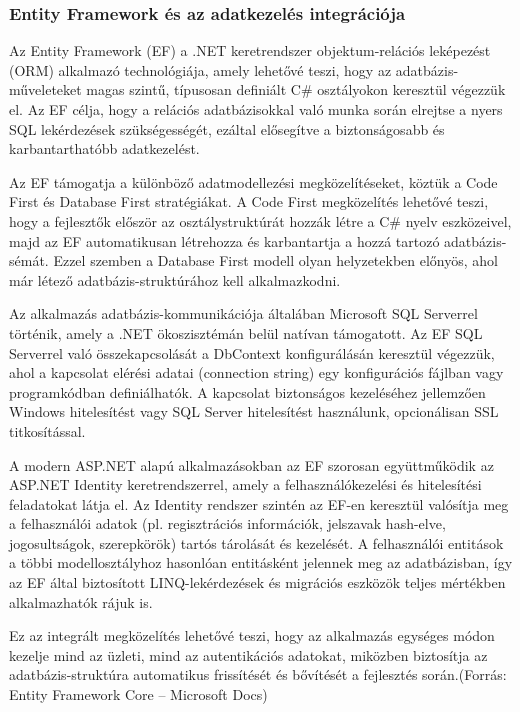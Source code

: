 \subsubsection{Entity Framework és az adatkezelés integrációja}

\indent Az Entity Framework (EF) a .NET keretrendszer objektum-relációs leképezést (ORM) alkalmazó technológiája, amely lehetővé teszi, hogy az adatbázis-műveleteket magas szintű, típusosan definiált C\# osztályokon keresztül végezzük el. Az EF célja, hogy a relációs adatbázisokkal való munka során elrejtse a nyers SQL lekérdezések szükségességét, ezáltal elősegítve a biztonságosabb és karbantarthatóbb adatkezelést.

Az EF támogatja a különböző adatmodellezési megközelítéseket, köztük a Code First és Database First stratégiákat. A Code First megközelítés lehetővé teszi, hogy a fejlesztők először az osztálystruktúrát hozzák létre a C\# nyelv eszközeivel, majd az EF automatikusan létrehozza és karbantartja a hozzá tartozó adatbázis-sémát. Ezzel szemben a Database First modell olyan helyzetekben előnyös, ahol már létező adatbázis-struktúrához kell alkalmazkodni.

Az alkalmazás adatbázis-kommunikációja általában Microsoft SQL Serverrel történik, amely a .NET ökoszisztémán belül natívan támogatott. Az EF SQL Serverrel való összekapcsolását a DbContext konfigurálásán keresztül végezzük, ahol a kapcsolat elérési adatai (connection string) egy konfigurációs fájlban vagy programkódban definiálhatók. A kapcsolat biztonságos kezeléséhez jellemzően Windows hitelesítést vagy SQL Server hitelesítést használunk, opcionálisan SSL titkosítással.

A modern ASP.NET alapú alkalmazásokban az EF szorosan együttműködik az ASP.NET Identity keretrendszerrel, amely a felhasználókezelési és hitelesítési feladatokat látja el. Az Identity rendszer szintén az EF-en keresztül valósítja meg a felhasználói adatok (pl. regisztrációs információk, jelszavak hash-elve, jogosultságok, szerepkörök) tartós tárolását és kezelését. A felhasználói entitások a többi modellosztályhoz hasonlóan entitásként jelennek meg az adatbázisban, így az EF által biztosított LINQ-lekérdezések és migrációs eszközök teljes mértékben alkalmazhatók rájuk is.

Ez az integrált megközelítés lehetővé teszi, hogy az alkalmazás egységes módon kezelje mind az üzleti, mind az autentikációs adatokat, miközben biztosítja az adatbázis-struktúra automatikus frissítését és bővítését a fejlesztés során.(Forrás: Entity Framework Core – Microsoft Docs)

